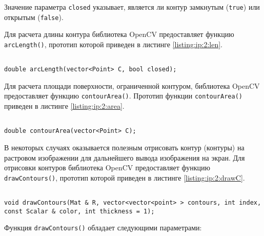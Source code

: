 Значение параметра \verb|closed| указывает, является ли контур замкнутым (\verb|true|) или открытым (\verb|false|).


Для расчета длины контура библиотека OpenCV предоставляет функцию \verb|arcLength()|, прототип которой приведен в листинге \ref{listing:ip:2:len}.

\begin{lstlisting}

double arcLength(vector<Point> C, bool closed);

\end{lstlisting}
\mylistingend


Для расчета площади поверхности, ограниченной контуром, библиотека OpenCV предоставляет функцию \verb|contourArea()|. Прототип функции \verb|contourArea()| приведен в листинге \ref{listing:ip:2:area}.

\begin{lstlisting}

double contourArea(vector<Point> C);

\end{lstlisting}
\mylistingend


В некоторых случаях оказывается полезным отрисовать контур (контуры) на растровом изображении для дальнейшего вывода изображения на экран. Для отрисовки контуров библиотека OpenCV предоставляет функцию \verb|drawContours()|, прототип которой приведен в листинге \ref{listing:ip:2:drawC}.

\begin{lstlisting}

void drawContours(Mat & R, vector<vector<point> > contours, int index, const Scalar & color, int thickness = 1);

\end{lstlisting}
\mylistingend

Функция \verb|drawContours()| обладает следующими параметрами:


